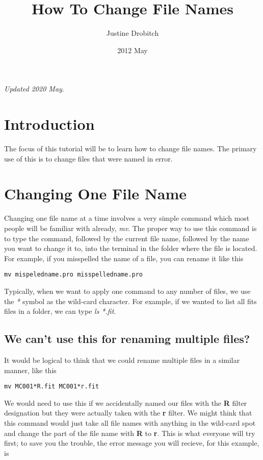 \documentclass[10pt,preprint]{article}
\begin{document}
\title{How To Change File Names}
\author{Justine Drobitch}
\date{2012 May}
\maketitle

\emph{Updated 2020 May}.

\section{Introduction}
The focus of this tutorial will be to learn how to change file names.  The primary use of this is to change files that were named in error.

\section{Changing One File Name}

Changing one file name at a time involves a very simple command which most people will be familiar with already, \emph{mv}. The proper way to use this command is to type the command, followed by the current file name, followed by the name you want to change it to, into the terminal in the folder where the file is located.  For example, if you misspelled the name of a file, you can rename it like this

\begin{verbatim}
mv mispeledname.pro misspelledname.pro 
\end{verbatim}

Typically, when we want to apply one command to any number of files, we use the \emph{*} symbol as the wild-card character.  For example, if we wanted to list all fits files in a folder, we can type \emph{ls *.fit}.  

\subsection{We can't use this for renaming multiple files?}
It would be logical to think that we could rename multiple files in a similar manner, like this

\begin{verbatim}
mv MC001*R.fit MC001*r.fit
\end{verbatim}

We would need to use this if we accidentally named our files with the \textbf{R} filter designation but they were actually taken with the \textbf{r} filter.  We might think that this command would just take all file names with anything in the wild-card spot and change the part of the file name with \textbf{R} to \textbf{r}.  This is what everyone will try first; to save you the trouble, the error message you will recieve, for this example, is
\end{document}
